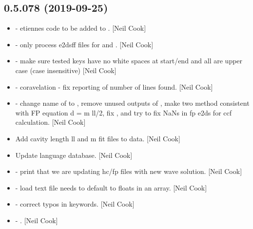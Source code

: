 \documentclass[a4paper,10pt,english]{report}
\begin{document}
\subsection{0.5.078 (2019-09-25)}
\label{\detokenize{misc/changelog:id64}}\begin{itemize}
\item {} 
 - etiennes code to be added to .
{[}Neil Cook{]}

\item {} 
 - only process e2dsff files for  and
. {[}Neil Cook{]}

\item {} 
 - make sure tested keys have no white spaces at
start/end and all are upper case (case insensitive) {[}Neil Cook{]}

\item {} 
 - coravelation - fix reporting of number
of lines found. {[}Neil Cook{]}

\item {} 
 - change name of  to
, remove unused outputs of ,
make two method consistent with FP equation d = m \sphinxtitleref{*} ll/2, fix
, and try to fix NaNs in fp e2ds for ccf
calculation. {[}Neil Cook{]}

\item {} 
Add cavity length ll and m fit files to data. {[}Neil Cook{]}

\item {} 
Update language database. {[}Neil Cook{]}

\item {} 
 - print that we are updating hc/fp
files with new wave solution. {[}Neil Cook{]}

\item {} 
 - load text file needs to default to floats in an
array. {[}Neil Cook{]}

\item {} 
 - correct typos in
keywords. {[}Neil Cook{]}

\item {} 
 - .
{[}Neil Cook{]}

\end{itemize}
\end{document}
